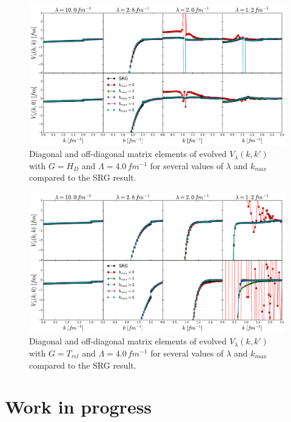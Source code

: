 \documentclass[preprintnumbers,floatfix,aps,prc,preprint]{revtex4-1}
\begin{document}
\begin{figure}[H]
  \centering
  \includegraphics[width=15cm]{mag_diags_offdiags_RKE_4_Wegner}
   \hspace*{0.05\textwidth}%
  \caption{Diagonal and off-diagonal matrix elements of evolved $V_{\lambda}(k,k')$ with $G=H_{D}$ and $\Lambda=4.0 \, fm^{-1}$ for several values of $\lambda$ and $k_{max}$ compared to the SRG result.}
  \label{fig:mag_diags_offdiags_RKE_4_Wegner}
\end{figure}
%
\begin{figure}[H]
  \centering
  \includegraphics[width=15cm]{mag_diags_offdiags_RKE_4_Wilson}
   \hspace*{0.05\textwidth}%
  \caption{Diagonal and off-diagonal matrix elements of evolved $V_{\lambda}(k,k')$ with $G=T_{rel}$ and $\Lambda=4.0 \, fm^{-1}$ for several values of $\lambda$ and $k_{max}$ compared to the SRG result.}
  \label{fig:mag_diags_offdiags_RKE_4_Wilson}
\end{figure}

\newpage

\section{Work in progress}
\label{sec:future}
\end{document}
